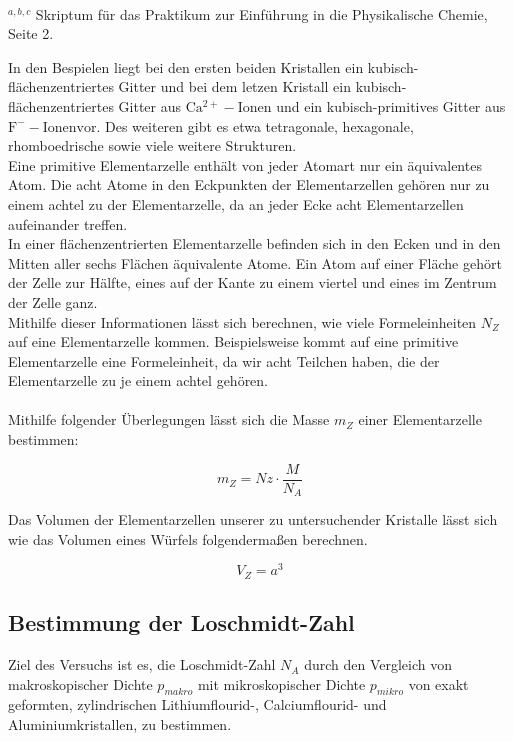 \documentclass[12pt,a4paper,titlepage,headinclude,bibtotoc]{scrartcl}
\begin{document}
\hrulefill\\
$^{a,b,c}$ Skriptum für das Praktikum zur Einführung in die Physikalische Chemie, Seite 2.

\vspace{10cm}
In den Bespielen liegt bei den ersten beiden Kristallen ein kubisch-flächenzentriertes Gitter und bei dem letzen Kristall ein kubisch-flächenzentriertes Gitter aus $\mathrm {Ca^{2+}-Ionen}$ und ein kubisch-primitives Gitter aus $ \mathrm {F^{-}-Ionen vor}$. Des weiteren gibt es etwa tetragonale, hexagonale, rhomboedrische sowie viele weitere Strukturen.\\ Eine primitive Elementarzelle enthält von jeder Atomart nur ein äquivalentes Atom. Die acht Atome in den Eckpunkten der Elementarzellen gehören nur zu einem achtel zu der Elementarzelle, da an jeder Ecke acht Elementarzellen aufeinander treffen.\\
In einer flächenzentrierten Elementarzelle befinden sich in den Ecken und in den Mitten aller sechs Flächen äquivalente Atome. Ein Atom auf einer Fläche gehört der Zelle zur Hälfte, eines auf der Kante zu einem viertel und eines im Zentrum der Zelle ganz.\\
Mithilfe dieser Informationen lässt sich berechnen, wie viele Formeleinheiten $N_{Z}$ auf eine Elementarzelle kommen. Beispielsweise kommt auf eine primitive Elementarzelle eine Formeleinheit, da wir acht Teilchen haben, die der Elementarzelle zu je einem achtel gehören.\\\\ Mithilfe folgender Überlegungen lässt sich die Masse $m_{Z}$ einer Elementarzelle bestimmen:

\begin{equation}
m_{Z}=Nz \cdot \dfrac{M}{N_{A}}
\end{equation} 

Das Volumen der Elementarzellen unserer zu untersuchender Kristalle lässt sich wie das Volumen eines Würfels folgendermaßen berechnen.

\begin{equation}
V_Z = a^3
\end{equation}


\subsection{Bestimmung der Loschmidt-Zahl}
 
Ziel des Versuchs ist es, die Loschmidt-Zahl $N_{A}$ durch den Vergleich von makroskopischer Dichte $p_{makro}$ mit mikroskopischer Dichte $p_{mikro}$ von exakt geformten, zylindrischen Lithiumflourid-, Calciumflourid- und Aluminiumkristallen, zu bestimmen.\\\\
\end{document}

